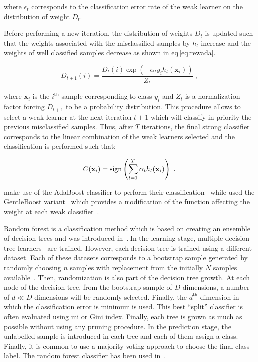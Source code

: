 \noindent where $\epsilon_t$ corresponds to the classification error rate of the weak learner on the distribution of weight $D_t$.

Before performing a new iteration, the distribution of weights $D_t$ is updated such that the weights associated with the misclassified samples by $h_t$ increase and the weights of well classified samples decrease as shown in \acs{eq}\,\eqref{eq:rewada}.

\begin{equation}
	D_{t+1}(i) = \frac{ D_t(i) \exp \left( -\alpha_t y_i h_{t}(\mathbf{x}_{i} ) \right) }{ Z_t  } \ ,
	\label{eq:rewada} 
\end{equation}

\noindent where $\mathbf{x}_i$ is the $i^{\text{th}}$ sample corresponding to class $y_i$ and $Z_t$ is a normalization factor forcing $D_{t+1}$ to be a probability distribution. 
This procedure allows to select a weak learner at the next iteration $t+1$ which will classify in priority the previous misclassified samples. 
Thus, after $T$ iterations, the final strong classifier corresponds to the linear combination of the weak learners selected and the classification is performed such that:

\begin{equation}
	C(\mathbf{x}_i) = \operatorname*{sign} \left( \sum_{t=1}^{T} \alpha_t h_t(\mathbf{x}_i) \right) \ .
	\label{eq:strclaada}
\end{equation}

\citeauthor{Lopes2011} make use of the AdaBoost classifier to perform their classification~\cite{Lopes2011} while \citeauthor{Litjens2014} used the GentleBoost variant~\cite{Friedman1998} which provides a modification of the function affecting the weight at each weak classifier~\cite{Litjens2014}.

Random forest is a classification method which is based on creating an ensemble of decision trees and was introduced in~\cite{Breiman2001}.
In the learning stage, multiple decision tree learners~\cite{Breiman1984} are trained.
However, each decision tree is trained using a different dataset.
Each of these datasets corresponds to a bootstrap sample generated by randomly choosing $n$ samples with replacement from the initially $N$ samples available~\cite{Efron1979}.
Then, randomization is also part of the decision tree growth.
At each node of the decision tree, from the bootstrap sample of $D$ dimensions, a number of $d \ll D$ dimensions will be randomly selected.
Finally, the $d^{\text{th}}$ dimension in which the classification error is minimum is used.
This best ``split'' classifier is often evaluated using \ac{mi} or Gini index.
Finally, each tree is grown as much as possible without using any pruning procedure.
In the prediction stage, the unlabelled sample is introduced in each tree and each of them assign a class.
Finally, it is common to use a majority voting approach to choose the final class label.
The random forest classifier has been used in~\cite{Kelm2007,Litjens2014,Tiwari2012,Tiwari2013,Viswanath2009,trigui2017automatic,trigui2016classification,samarasinghe2016semi,rampun2015classifying,rampun2016computerb,rampun2015computer,rampun2016computer}.

